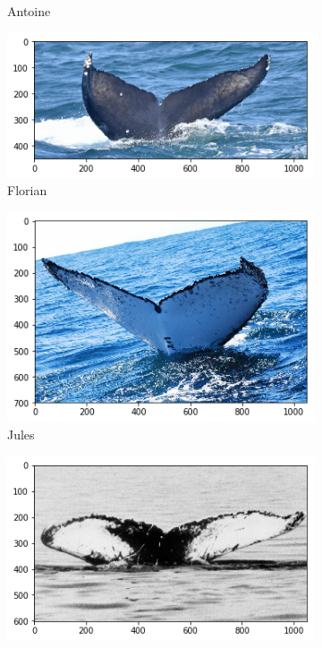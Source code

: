 \begin{frame}[c]
\begin{figure}
\begin{subfigure}[b]{0.24\linewidth}
            \caption{Antoine}
        \end{subfigure}
        \begin{subfigure}[b]{0.24\linewidth}
            \centering
            \includegraphics[width=\linewidth]{Whales/w_9a5bb2d.png}
            \caption{Florian}
        \end{subfigure}
        \begin{subfigure}[b]{0.24\linewidth}
            \centering
            \includegraphics[width=\linewidth]{Whales/new_whale1.png}
            \caption{Jules}
        \end{subfigure}
        \begin{subfigure}[b]{0.24\linewidth}
            \centering
            \includegraphics[width=\linewidth]{Whales/new_whale5.png}

\end{subfigure}
\end{figure}
\end{frame}
